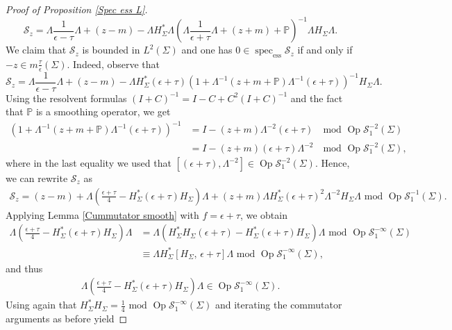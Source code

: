 \documentclass[11pt,a4paper,reqno,oneside]{amsproc}
\DeclareMathOperator{\spec}{spec}
\DeclareMathOperator{\Op}{Op}
\newcommand{\spece}{\spec_\mathrm{ess}}
\newcommand{\cS}{\mathcal{S}}
\numberwithin{equation}{section}
\begin{document}
\begin{proof}[Proof of Proposition \ref{Spec ess L}]
\[
\mathcal S_z= \Lambda \frac{1}{\epsilon-\tau}\Lambda +(z-m) - \Lambda H_\Sigma^\ast \Lambda \left(\Lambda\frac{1}{\epsilon+\tau}\Lambda +(z+m) + \mathbb P \right)^{-1} \Lambda H_\Sigma \Lambda.
\]
We claim that $\mathcal S_z$ is bounded in $L^2(\Sigma)$ and one has  $0\in \spece \mathcal S_z$ if and only if $-z\in m \frac{\tau}{\epsilon}(\Sigma)$. Indeed, observe that 
\[
\mathcal S_z= \Lambda \frac{1}{\epsilon-\tau}\Lambda +(z-m) - \Lambda H_\Sigma^\ast(\epsilon+\tau) \left(1+\Lambda^{-1}(z+m + \mathbb P)\Lambda^{-1} (\epsilon+\tau)\right)^{-1} H_\Sigma \Lambda.
\]
Using the resolvent formulas $(I+C)^{-1}= I-C+ C^2(I+C)^{-1}$ and the fact that $\mathbb P$ is a smoothing operator, we get 
\begin{align*}
\left(1+\Lambda^{-1}(z+m + \mathbb P)\Lambda^{-1} (\epsilon+\tau)\right)^{-1}&= I-(z+m) \Lambda^{-2}(\epsilon+\tau)\quad \mathrm{ mod }\,\,  \Op \cS^{-2}_1(\Sigma)\\
&= I-(z+m) (\epsilon+\tau)\Lambda^{-2}\quad \mathrm{ mod }\,\,  \Op \cS^{-2}_1(\Sigma),
\end{align*}
where in the last equality we used that $[ (\epsilon+\tau),\Lambda^{-2} ]\in \Op \cS^{-2}_1(\Sigma)$. Hence, we can rewrite $\mathcal S_z$ as
\begin{align*}
\mathcal S_z= (z-m) +\Lambda \left(\frac{\epsilon+\tau}{4} -    H_\Sigma^\ast(\epsilon+\tau) H_\Sigma \right)\Lambda +(z+m) \Lambda H_\Sigma^\ast(\epsilon+\tau)^2\Lambda^{-2} H_\Sigma \Lambda \,\, \mathrm{ mod }\,\,  \Op \cS^{-1}_1(\Sigma).
\end{align*}
 Applying Lemma \ref{Cummutator smooth} with $f=\epsilon +\tau$, we obtain
\begin{align*}
\Lambda \left(\frac{\epsilon+\tau}{4} -   H_\Sigma^\ast(\epsilon+\tau) H_\Sigma \right)\Lambda &= \Lambda \left(H_\Sigma^\ast H_\Sigma(\epsilon+\tau) -    H_\Sigma^\ast(\epsilon+\tau) H_\Sigma \right) \Lambda\,\, \mathrm{ mod }\,\,  \Op \cS^{-\infty}_1(\Sigma)\\
&\equiv \Lambda H_\Sigma^\ast [ H_\Sigma,\,\epsilon+\tau] \Lambda \,\, \mathrm{ mod }\,\,  \Op \cS^{-\infty}_1(\Sigma),
\end{align*}
and thus
\begin{align*}
\Lambda \left(\frac{\epsilon+\tau}{4} -   H_\Sigma^\ast(\epsilon+\tau) H_\Sigma \right)\Lambda \in  \Op \cS^{-\infty}_1(\Sigma).
\end{align*}
Using again that $H_\Sigma^\ast H_\Sigma= \frac{1}{4} \,\, \mathrm{ mod }\,\,  \Op \cS^{-\infty}_1(\Sigma)$ and  iterating the commutator arguments as before yield

\end{proof}
\end{document}
